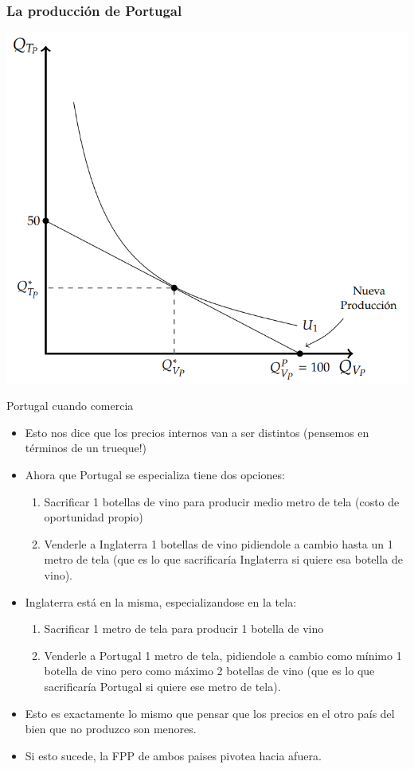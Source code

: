 \documentclass{beamer}
\begin{document}
\begin{frame}
    \frametitle{La producción de Portugal}
    \centering
    \includegraphics[scale=0.6]{../Figures/C18.6.png}
\end{frame}

\begin{frame}{Portugal cuando comercia}
    \begin{itemize}
        \item Esto nos dice que los precios internos van a ser distintos (pensemos en términos de un trueque!)
        \item Ahora que Portugal se especializa tiene dos opciones:
        \begin{enumerate}
            \item Sacrificar 1 botellas de vino para producir medio metro de tela (costo de oportunidad propio)
            \item Venderle a Inglaterra 1 botellas de vino pidiendole a cambio hasta un 1 metro de tela (que es lo que sacrificaría Inglaterra si quiere esa botella de vino).
        \end{enumerate}
        \item Inglaterra está en la misma, especializandose en la tela:
        \begin{enumerate}
            \item Sacrificar 1 metro de tela para producir 1 botella de vino
            \item Venderle a Portugal 1 metro de tela, pidiendole a cambio como mínimo 1 botella de vino pero como máximo 2 botellas de vino (que es lo que sacrificaría Portugal si quiere ese metro de tela).
        \end{enumerate}
        \item Esto es exactamente lo mismo que pensar que los precios en el otro país del bien que no produzco son menores.
        \item Si esto sucede, la FPP de ambos paises pivotea hacia afuera. 
    \end{itemize}
\end{frame}
\end{document}
